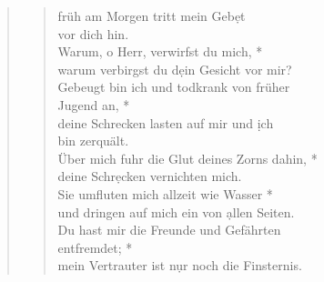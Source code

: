 \begin{quote}
\begin{verse}
\vin früh am Morgen tritt mein Geb\d et \\ \vin vor dich hin.\\ 
 Warum, o Herr, verwirfst du mich, *\\
 warum verbirgst du d\d ein Gesicht vor mir? \\
\vin Gebeugt bin ich und todkrank von früher\\ \vin  Jugend an, *\\
\vin deine Schrecken lasten auf mir und \d ich \\ \vin  bin zerquält.\\ 
 Über mich fuhr die Glut deines Zorns dahin, *\\
 deine Schr\d ecken vernichten mich.\\
\vin Sie umfluten mich allzeit wie Wasser *\\
\vin und dringen auf mich ein von \d allen Seiten.\\ 
 Du hast mir die Freunde und Gefährten\\ entfremdet; *\\
mein Vertrauter ist n\d ur noch die Finsternis.\\ 

\end{verse}

\end{quote}

\vspace{0.3cm}

\def\greinitialformat#1{{\fontsize{40}{40}\selectfont #1}}
\gresetfirstlineaboveinitial{\small \textcolor{red}{Ier 31}}{}
\setaboveinitialseparation{0.72mm}



